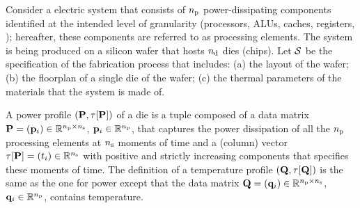 Consider a electric system that consists of ${n_\text{p}}$ power-dissipating components identified at the intended level of granularity (processors, ALUs, caches, registers, \etc); hereafter, these components are referred to as processing elements.
The system is being produced on a silicon wafer that hosts ${n_\text{d}}$ dies (chips).
Let $\mathcal{S}$ be the specification of the fabrication process that includes: (a) the layout of the wafer; (b) the floorplan of a single die of the wafer; (c) the thermal parameters of the materials that the system is made of.

A power profile $\profileP$ of a die is a tuple composed of a data matrix $\mathbf{P} = (\mathbf{p}_i) \in \mathbb{R}^{{n_\text{p}} \times {n_\text{s}}}$, $\mathbf{p}_i \in \mathbb{R}^{n_\text{p}}$, that captures the power dissipation of all the ${n_\text{p}}$ processing elements at ${n_\text{s}}$ moments of time and a (column) vector $\tau[\mathbf{P}] = (t_i) \in \mathbb{R}^{{n_\text{s}}}$ with positive and strictly increasing components that specifies these moments of time.
The definition of a temperature profile $\profileT$ is the same as the one for power except that the data matrix $\mathbf{Q} = (\mathbf{q}_i) \in \mathbb{R}^{{n_\text{p}} \times {n_\text{s}}}$, $\mathbf{q}_i \in \mathbb{R}^{n_\text{p}}$, contains temperature.

